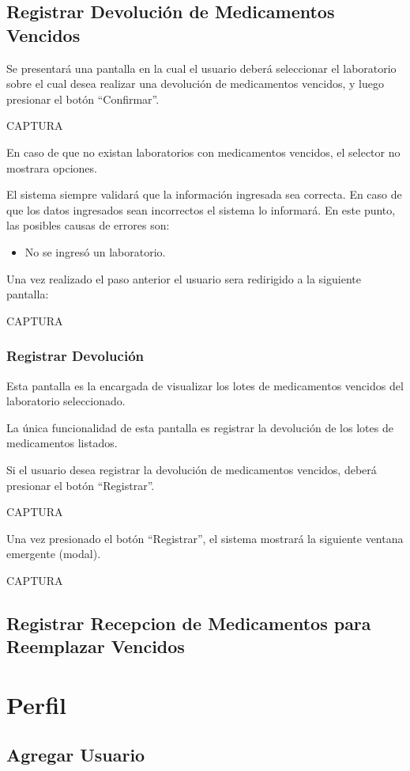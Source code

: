 \documentclass[letterpaper,10pt,spanish]{sphinxmanual}
\begin{document}
\section{Registrar Devolución de Medicamentos Vencidos}
\label{devolucionvencidos::doc}\label{devolucionvencidos:registrar-devolucion-de-medicamentos-vencidos}
Se presentará una pantalla en la cual el usuario deberá seleccionar el laboratorio sobre el cual desea realizar una devolución de medicamentos vencidos, y luego presionar el botón “Confirmar”.

CAPTURA

En caso de que no existan laboratorios con medicamentos vencidos, el selector no mostrara opciones.

El sistema siempre validará que la información ingresada sea correcta. En caso de que los datos ingresados sean incorrectos el sistema lo informará. En este punto, las posibles causas de errores son:
\begin{itemize}
\item {} 
No se ingresó un laboratorio.

\end{itemize}

Una vez realizado el paso anterior el usuario sera redirigido a la siguiente pantalla:

CAPTURA


\subsection{Registrar Devolución}
\label{devolucionvencidos:registrar-devolucion}
Esta pantalla es la encargada de visualizar los lotes de medicamentos vencidos del laboratorio seleccionado.

La única funcionalidad de esta pantalla es registrar la devolución de los lotes de medicamentos listados.

Si el usuario desea registrar la devolución de medicamentos vencidos, deberá presionar el botón “Registrar”.

CAPTURA

Una vez presionado el botón “Registrar”, el sistema mostrará la siguiente ventana emergente (modal).

CAPTURA


\section{Registrar Recepcion de Medicamentos para Reemplazar Vencidos}
\label{reemplazovencidos:registrar-recepcion-de-medicamentos-para-reemplazar-vencidos}\label{reemplazovencidos::doc}

\chapter{Perfil}
\label{perfil:perfil}\label{perfil::doc}

\section{Agregar Usuario}
\label{agregarusuario::doc}\label{agregarusuario:agregar-usuario}


\renewcommand{\indexname}{Índice}
\printindex
\end{document}
